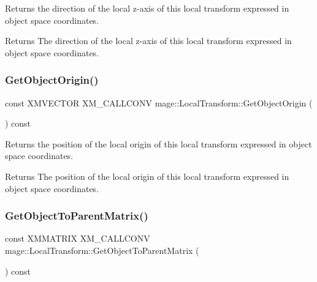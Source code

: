Returns the direction of the local z-\/axis of this local transform expressed in object space coordinates.

\begin{DoxyReturn}{Returns}
The direction of the local z-\/axis of this local transform expressed in object space coordinates. 
\end{DoxyReturn}
\hypertarget{classmage_1_1_local_transform_abaa858e23864984b339b2fa26607c026}{}\label{classmage_1_1_local_transform_abaa858e23864984b339b2fa26607c026} 
\subsubsection{\texorpdfstring{Get\+Object\+Origin()}{GetObjectOrigin()}}
{\footnotesize\ttfamily const X\+M\+V\+E\+C\+T\+OR X\+M\+\_\+\+C\+A\+L\+L\+C\+O\+NV mage\+::\+Local\+Transform\+::\+Get\+Object\+Origin (\begin{DoxyParamCaption}{ }\end{DoxyParamCaption}) const\hspace{0.3cm}{\ttfamily [noexcept]}}

Returns the position of the local origin of this local transform expressed in object space coordinates.

\begin{DoxyReturn}{Returns}
The position of the local origin of this local transform expressed in object space coordinates. 
\end{DoxyReturn}
\hypertarget{classmage_1_1_local_transform_aaf08dbe2fd5125b11e61fc052911dbb6}{}\label{classmage_1_1_local_transform_aaf08dbe2fd5125b11e61fc052911dbb6} 
\subsubsection{\texorpdfstring{Get\+Object\+To\+Parent\+Matrix()}{GetObjectToParentMatrix()}}
{\footnotesize\ttfamily const X\+M\+M\+A\+T\+R\+IX X\+M\+\_\+\+C\+A\+L\+L\+C\+O\+NV mage\+::\+Local\+Transform\+::\+Get\+Object\+To\+Parent\+Matrix (\begin{DoxyParamCaption}{ }\end{DoxyParamCaption}) const\hspace{0.3cm}{\ttfamily [noexcept]}}

